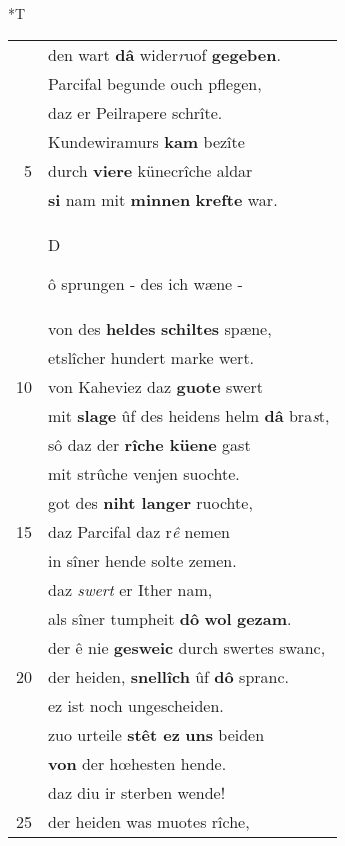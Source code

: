 \documentclass[8pt,a4paper,notitlepage]{article}
\begin{document}
\begin{table}[ht]
\begin{minipage}[t]{0.5\linewidth}
\end{minipage}
\hspace{0.5cm}
\begin{minipage}[t]{0.5\linewidth}
\small
\begin{center}*T
\end{center}
\begin{tabular}{rl}
 & den wart \textbf{dâ} wider\textit{r}uof \textbf{gegeben}.\\ 
 & Parcifal begunde ouch pflegen,\\ 
 & daz er Peilrapere schrîte.\\ 
 & Kundewiramurs \textbf{kam} bezîte\\ 
5 & durch \textbf{viere} künecrîche aldar\\ 
 & \textbf{si} nam mit \textbf{minnen} \textbf{krefte} war.\\ 
 & \begin{large}D\end{large}ô sprungen - des ich wæne -\\ 
 & von des \textbf{heldes} \textbf{schiltes} spæne,\\ 
 & etslîcher hundert marke wert.\\ 
10 & von Kaheviez daz \textbf{guote} swert\\ 
 & mit \textbf{slage} ûf des heidens helm \textbf{dâ} bra\textit{s}t,\\ 
 & sô daz der \textbf{rîche küene} gast\\ 
 & mit strûche venjen suochte.\\ 
 & got des \textbf{niht langer} ruochte,\\ 
15 & daz Parcifal daz r\textit{ê} nemen\\ 
 & in sîner hende solte zemen.\\ 
 & daz \textit{swert} er Ither nam,\\ 
 & als sîner tumpheit \textbf{dô} \textbf{wol} \textbf{gezam}.\\ 
 & der ê nie \textbf{gesweic} durch swertes swanc,\\ 
20 & der heiden, \textbf{snellîch} ûf \textbf{dô} spranc.\\ 
 & ez ist noch ungescheiden.\\ 
 & zuo urteile \textbf{stêt ez} \textbf{uns} beiden\\ 
 & \textbf{von} der hœhesten hende.\\ 
 & daz diu ir sterben wende!\\ 
25 & der heiden was muotes rîche,\\ 

\end{tabular}
\end{minipage}
\end{table}
\end{document}
